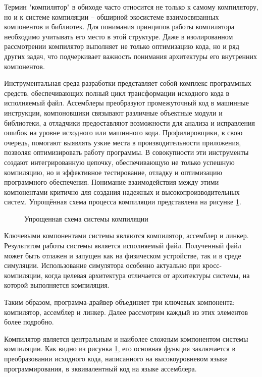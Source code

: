Термин "компилятор" в обиходе часто относится не только к самому компилятору, но и к системе компиляции -- обширной экосистеме взаимосвязанных компонентов и библиотек. Для понимания принципов работы компилятора необходимо учитывать его место в этой структуре. Даже в изолированном рассмотрении компилятор выполняет не только оптимизацию кода, но и ряд других задач, что подчеркивает важность понимания архитектуры его внутренних компонентов.

Инструментальная среда разработки представляет собой комплекс программных средств, обеспечивающих полный цикл трансформации исходного кода в исполняемый файл. Ассемблеры преобразуют промежуточный код в машинные инструкции, компоновщики связывают различные объектные модули и библиотеки, а отладчики предоставляют возможности для анализа и исправления ошибок на уровне исходного или машинного кода. Профилировщики, в свою очередь, помогают выявлять узкие места в производительности приложения, позволяя оптимизировать работу программы. В совокупности эти инструменты создают интегрированную цепочку, обеспечивающую не только успешную компиляцию, но и эффективное тестирование, отладку и оптимизацию программного обеспечения. Понимание взаимодействия между этими компонентами критично для создания надежных и высокопроизводительных систем.
Упрощённая схема процесса компиляции представлена на рисунке \ref{fig:tulchain}.

\begin{figure}[H]
	\centering
	\caption{Упрощенная схема системы компиляции}
	\label{fig:tulchain}
\end{figure}

 Ключевыми компонентами системы являются компилятор, ассемблер и линкер. Результатом работы системы является исполняемый файл. Полученный файл может быть отлажен и запущен как на физическом устройстве, так и в среде симуляции. Использование симулятора особенно актуально при кросс-компиляции, когда целевая архитектура отличается от архитектуры системы, на которой выполняется компиляция.

Таким образом, программа-драйвер объединяет три ключевых компонента: компилятор, ассемблер и линкер. Далее рассмотрим каждый из этих элементов более подробно.

Компилятор является центральным и наиболее сложным компонентом системы компиляции. Как видно из рисунка \ref{fig:tulchain}, его основная функция заключается в преобразовании исходного кода, написанного на высокоуровневом языке программирования, в эквивалентный код на языке ассемблера. 

